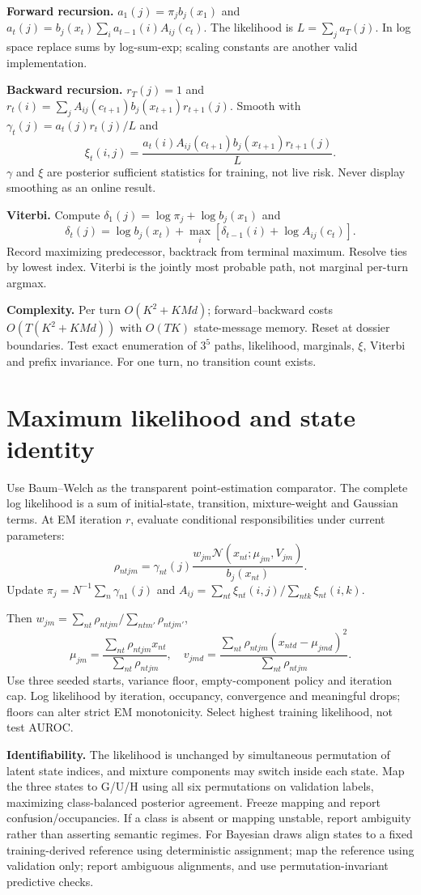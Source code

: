 \documentclass[11pt,letterpaper]{article}
\newcommand{\sectionpage}[1]{\clearpage\section{#1}}
\begin{document}
\textbf{Forward recursion.} $a_1(j)=\pi_j b_j(x_1)$ and
$a_t(j)=b_j(x_t)\sum_i a_{t-1}(i)A_{ij}(c_t)$.
The likelihood is $L=\sum_j a_T(j)$. In log space replace sums by log-sum-exp; scaling constants are another valid implementation.

\textbf{Backward recursion.} $r_T(j)=1$ and
$r_t(i)=\sum_jA_{ij}(c_{t+1})b_j(x_{t+1})r_{t+1}(j)$.
Smooth with $\gamma_t(j)=a_t(j)r_t(j)/L$ and
\[
\xi_t(i,j)=\frac{a_t(i)A_{ij}(c_{t+1})b_j(x_{t+1})r_{t+1}(j)}{L}.
\]
$\gamma$ and $\xi$ are posterior sufficient statistics for training, not live risk. Never display smoothing as an online result.

\textbf{Viterbi.} Compute $\delta_1(j)=\log\pi_j+\log b_j(x_1)$ and
\[
\delta_t(j)=\log b_j(x_t)+\max_i[\delta_{t-1}(i)+\log A_{ij}(c_t)].
\]
Record maximizing predecessor, backtrack from terminal maximum. Resolve ties by lowest index. Viterbi is the jointly most probable path, not marginal per-turn argmax.

\textbf{Complexity.} Per turn $O(K^2+KMd)$; forward--backward costs $O(T(K^2+KMd))$ with $O(TK)$ state-message memory. Reset at dossier boundaries. Test exact enumeration of $3^5$ paths, likelihood, marginals, $\xi$, Viterbi and prefix invariance. For one turn, no transition count exists.

\sectionpage{Maximum likelihood and state identity}
Use Baum--Welch as the transparent point-estimation comparator. The complete log likelihood is a sum of initial-state, transition, mixture-weight and Gaussian terms. At EM iteration $r$, evaluate conditional responsibilities under current parameters:
\[
\rho_{ntjm}=\gamma_{nt}(j)\frac{w_{jm}\mathcal N(x_{nt};\mu_{jm},V_{jm})}{b_j(x_{nt})}.
\]
Update $\pi_j=N^{-1}\sum_n\gamma_{n1}(j)$ and
$A_{ij}=\sum_{nt}\xi_{nt}(i,j)/\sum_{ntk}\xi_{nt}(i,k)$.
\par Then $w_{jm}=\sum_{nt}\rho_{ntjm}/\sum_{ntm'}\rho_{ntjm'}$,
\[
\mu_{jm}=\frac{\sum_{nt}\rho_{ntjm}x_{nt}}{\sum_{nt}\rho_{ntjm}},
\quad
v_{jmd}=\frac{\sum_{nt}\rho_{ntjm}(x_{ntd}-\mu_{jmd})^2}{\sum_{nt}\rho_{ntjm}}.
\]
Use three seeded starts, variance floor, empty-component policy and iteration cap. Log likelihood by iteration, occupancy, convergence and meaningful drops; floors can alter strict EM monotonicity. Select highest training likelihood, not test AUROC.

\textbf{Identifiability.} The likelihood is unchanged by simultaneous permutation of latent state indices, and mixture components may switch inside each state. Map the three states to G/U/H using all six permutations on validation labels, maximizing class-balanced posterior agreement. Freeze mapping and report confusion/occupancies. If a class is absent or mapping unstable, report ambiguity rather than asserting semantic regimes. For Bayesian draws align states to a fixed training-derived reference using deterministic assignment; map the reference using validation only; report ambiguous alignments, and use permutation-invariant predictive checks.
\end{document}
